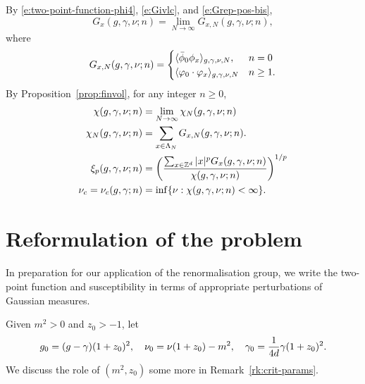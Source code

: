 By \eqref{e:two-point-function-phi4}, \eqref{e:Givlc}, and \eqref{e:Grep-pos-bis},
\begin{equation}
G_x(g, \gamma, \nu; n) = \lim_{N\to\infty} G_{x,N}(g, \gamma, \nu; n),
\end{equation}
where
\begin{equation}
G_{x,N}(g, \gamma, \nu; n)
	=
\begin{cases}
\langle \bar\phi_0 \phi_x \rangle_{g,\gamma,\nu,N},      & n = 0 \\
\langle \varphi_0 \cdot \varphi_x \rangle_{g,\gamma,\nu,N}  & n \ge 1.
\end{cases}
\end{equation}
By Proposition~\ref{prop:finvol}, for any integer $n \ge 0$,
\begin{align}
\label{e:chilim}
\chi(g, \gamma, \nu; n)
	&= \lim_{N\rightarrow\infty} \chi_N(g, \gamma, \nu; n) \\
\label{e:chiNdef}
\chi_N(g, \gamma, \nu; n)
	&= \sum_{x\in\Lambda_N} G_{x,N}(g, \gamma, \nu; n). \\
\label{e:clp}
\xi_p(g, \gamma, \nu; n)
	&= \left(\frac{\sum_{x\in{ {{\mathbb Z}}^d }} |x|^p G_x(g, \gamma, \nu; n)}{\chi(g, \gamma, \nu; n)}\right)^{1/p} \\
\label{e:nuc-def}
\nu_c
	= \nu_c(g, \gamma; n) &= \inf \{ \nu : \chi(g, \gamma, \nu; n) < \infty \}.
\end{align}


\section{Reformulation of the problem}

In preparation for our application of the renormalisation group, we write the
two-point function and susceptibility in terms of appropriate perturbations of
Gaussian measures.

Given $m^2>0$ and $z_0 > -1$, let
\begin{equation}
\label{e:gg0}
g_0 = (g - \gamma) (1 + z_0)^2,
	\quad
\nu_0 = \nu (1 + z_0) - m^2,
	\quad
\gamma_0 = \frac{1}{4d} \gamma (1 + z_0)^2.
\end{equation}
We discuss the role of $(m^2, z_0)$ some more in Remark~\ref{rk:crit-params}.

